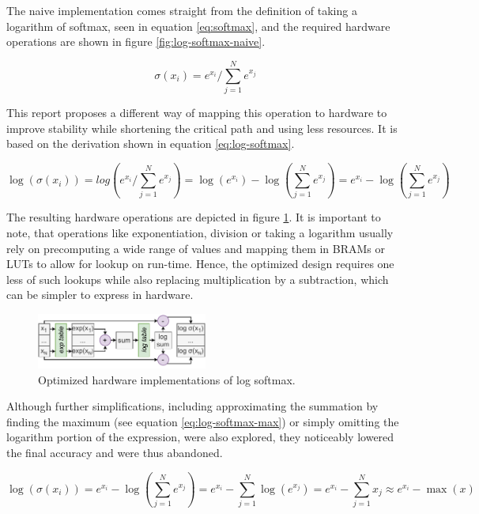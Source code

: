 The naive implementation comes straight from the definition of taking a logarithm of softmax, seen in equation \ref{eq:softmax}, and the required hardware operations are shown in figure \ref{fig:log-softmax-naive}.

\begin{equation} \label{eq:softmax}
    \sigma (x_i) = e^{x_i} / \sum_{j=1}^{N} e^{x_j}
\end{equation}

This report proposes a different way of mapping this operation to hardware to improve stability while shortening the critical path and using less resources. It is based on the derivation shown in equation \ref{eq:log-softmax}.

\begin{equation} \label{eq:log-softmax}
    \log (\sigma (x_i)) = log(e^{x_i} / \sum_{j=1}^{N} e^{x_j}) = \log(e^{x_i}) - \log(\sum_{j=1}^{N} e^{x_j}) = e^{x_i} - \log(\sum_{j=1}^{N} e^{x_j})
\end{equation}

The resulting hardware operations are depicted in figure \ref{fig:log-softmax-opt}. It is important to note, that operations like exponentiation, division or taking a logarithm usually rely on precomputing a wide range of values and mapping them in BRAMs or LUTs to allow for lookup on run-time. Hence, the optimized design requires one less of such lookups while also replacing multiplication by a subtraction, which can be simpler to express in hardware.

\begin{figure}[hpt!]
  \centering
  \includegraphics[trim={0cm 0cm 0cm 0cm}, width=0.5\textwidth, center]{quantization/log_softmax_opt_h.pdf}
  \caption{Optimized hardware implementations of log softmax.}
  \label{fig:log-softmax-opt}
\end{figure}

\clearpage
Although further simplifications, including approximating the summation by finding the maximum (see equation \ref{eq:log-softmax-max}) or simply omitting the logarithm portion of the expression, were also explored, they noticeably lowered the final accuracy and were thus abandoned.

\begin{equation} \label{eq:log-softmax-max}
    \log (\sigma (x_i)) = e^{x_i} - \log(\sum_{j=1}^{N} e^{x_j}) = e^{x_i} - \sum_{j=1}^{N} \log(e^{x_j}) = e^{x_i} - \sum_{j=1}^{N} x_j \approx e^{x_i} - \max(x)
\end{equation}


